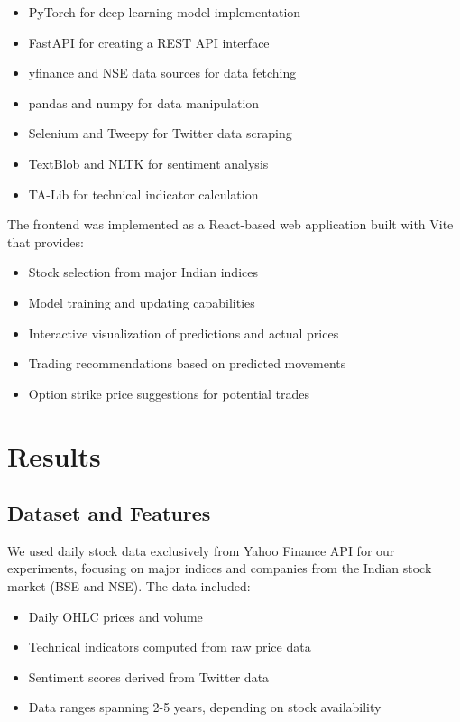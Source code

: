 \documentclass[conference]{IEEEtran}
\begin{document}
\begin{itemize}
\item PyTorch for deep learning model implementation
\item FastAPI for creating a REST API interface
\item yfinance and NSE data sources for data fetching
\item pandas and numpy for data manipulation
\item Selenium and Tweepy for Twitter data scraping
\item TextBlob and NLTK for sentiment analysis
\item TA-Lib for technical indicator calculation
\end{itemize}

The frontend was implemented as a React-based web application built with Vite that provides:

\begin{itemize}
\item Stock selection from major Indian indices
\item Model training and updating capabilities
\item Interactive visualization of predictions and actual prices
\item Trading recommendations based on predicted movements
\item Option strike price suggestions for potential trades
\end{itemize}

\section{Results}
\subsection{Dataset and Features}
We used daily stock data exclusively from Yahoo Finance API for our experiments, focusing on major indices and companies from the Indian stock market (BSE and NSE). The data included:

\begin{itemize}
\item Daily OHLC prices and volume
\item Technical indicators computed from raw price data
\item Sentiment scores derived from Twitter data
\item Data ranges spanning 2-5 years, depending on stock availability
\end{itemize}
\end{document}

